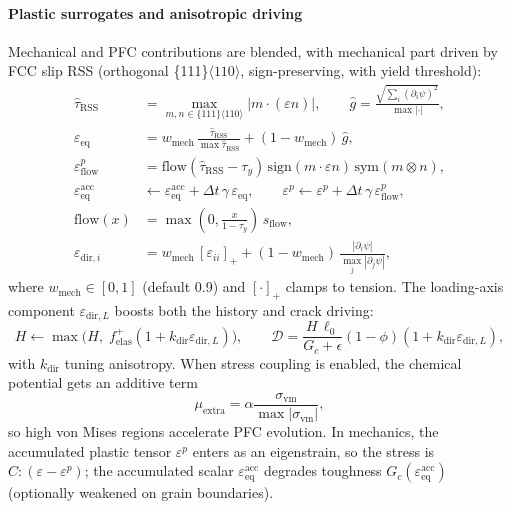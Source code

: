 \documentclass[11pt]{article}
\begin{document}
\paragraph{Plastic surrogates and anisotropic driving} Mechanical and PFC contributions are blended, with mechanical part driven by FCC slip RSS (orthogonal \{111\}$\langle 110\rangle$, sign-preserving, with yield threshold):
\begin{align}
\hat{\tau}_{\text{RSS}} &= \max_{m,n\in \{111\}\langle 110\rangle} |m\cdot(\varepsilon n)|, \qquad
\hat{g} = \frac{\sqrt{\sum_i (\partial_i \psi)^2}}{\max|\cdot|}, \\
\varepsilon_{\text{eq}} &= w_{\text{mech}}\,\frac{\hat{\tau}_{\text{RSS}}}{\max \hat{\tau}_{\text{RSS}}} + (1-w_{\text{mech}})\,\hat{g},\\
\varepsilon^p_{\text{flow}} &= \mathrm{flow}(\hat{\tau}_{\text{RSS}}-\tau_y)\,\mathrm{sign}(m\cdot\varepsilon n)\,\mathrm{sym}(m\otimes n),\\
\varepsilon_{\text{eq}}^{\text{acc}} &\leftarrow \varepsilon_{\text{eq}}^{\text{acc}} + \Delta t\,\gamma\,\varepsilon_{\text{eq}}, \qquad
\varepsilon^p \leftarrow \varepsilon^p + \Delta t\,\gamma\,\varepsilon^p_{\text{flow}},\\
\mathrm{flow}(x) &= \max\!\left(0, \frac{x}{1-\tau_y}\right)\, s_{\text{flow}},\\
\varepsilon_{\text{dir},i} &= w_{\text{mech}}\,[\varepsilon_{ii}]_+ + (1-w_{\text{mech}})\,\frac{|\partial_i \psi|}{\max_j |\partial_j \psi|},
\end{align}
where $w_{\text{mech}}\in[0,1]$ (default 0.9) and $[\cdot]_+$ clamps to tension. The loading-axis component $\varepsilon_{\text{dir},L}$ boosts both the history and crack driving:
\begin{equation}
H \leftarrow \max\!\big(H,\; f_{\text{elas}}^{+}(1+k_{\text{dir}}\varepsilon_{\text{dir},L})\big), \qquad
\mathcal{D} = \frac{H\,\ell_0}{G_c+\epsilon}(1-\phi)(1+k_{\text{dir}}\varepsilon_{\text{dir},L}),
\end{equation}
with $k_{\text{dir}}$ tuning anisotropy. When stress coupling is enabled, the chemical potential gets an additive term
\begin{equation}
\mu_{\text{extra}} = \alpha \frac{\sigma_{\text{vm}}}{\max |\sigma_{\text{vm}}|},
\end{equation}
so high von Mises regions accelerate PFC evolution. In mechanics, the accumulated plastic tensor $\varepsilon^p$ enters as an eigenstrain, so the stress is $C:(\varepsilon-\varepsilon^p)$; the accumulated scalar $\varepsilon_{\text{eq}}^{\text{acc}}$ degrades toughness $G_c(\varepsilon_{\text{eq}}^{\text{acc}})$ (optionally weakened on grain boundaries).
\end{document}
